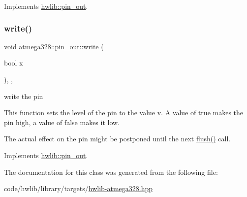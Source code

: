 Implements \hyperlink{classhwlib_1_1pin__out_ac22910317477a52431a44e7e3c66fc57}{hwlib\+::pin\+\_\+out}.

\mbox{\label{classatmega328_1_1pin__out_ae95d42790e9d8d97fb372637bf3c76e6}} 
\subsubsection{\texorpdfstring{write()}{write()}}
{\footnotesize\ttfamily void atmega328\+::pin\+\_\+out\+::write (\begin{DoxyParamCaption}\item[{bool}]{x }\end{DoxyParamCaption})\hspace{0.3cm}{\ttfamily [inline]}, {\ttfamily [override]}, {\ttfamily [virtual]}}





write the pin

This function sets the level of the pin to the value v. A value of true makes the pin high, a value of false makes it low.

The actual effect on the pin might be postponed until the next \hyperlink{classatmega328_1_1pin__out_a12371a15efd326dc559301a0751b899e}{flush()} call. 

Implements \hyperlink{classhwlib_1_1pin__out_a8d260a70e503dcfb81987c408e170300}{hwlib\+::pin\+\_\+out}.



The documentation for this class was generated from the following file\+:\begin{DoxyCompactItemize}
\item 
code/hwlib/library/targets/\hyperlink{hwlib-atmega328_8hpp}{hwlib-\/atmega328.\+hpp}\end{DoxyCompactItemize}

